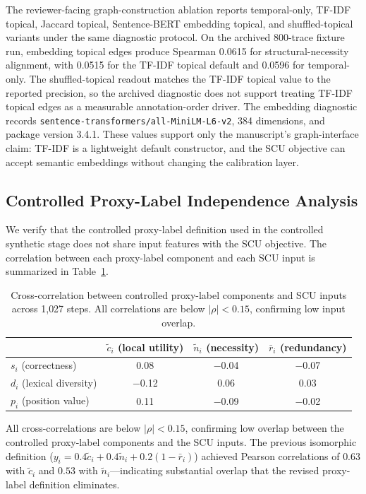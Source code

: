 \documentclass[pdflatex,sn-mathphys-num]{sn-jnl}
\begin{document}
The reviewer-facing graph-construction ablation reports temporal-only, TF-IDF topical, Jaccard topical, Sentence-BERT embedding topical, and shuffled-topical variants under the same diagnostic protocol. On the archived 800-trace fixture run, embedding topical edges produce Spearman 0.0615 for structural-necessity alignment, with 0.0515 for the TF-IDF topical default and 0.0596 for temporal-only. The shuffled-topical readout matches the TF-IDF topical value to the reported precision, so the archived diagnostic does not support treating TF-IDF topical edges as a measurable annotation-order driver. The embedding diagnostic records \texttt{sentence-transformers/all-MiniLM-L6-v2}, 384 dimensions, and package version 3.4.1. These values support only the manuscript's graph-interface claim: TF-IDF is a lightweight default constructor, and the SCU objective can accept semantic embeddings without changing the calibration layer.

\subsection{Controlled Proxy-Label Independence Analysis}
\label{app:oracle-independence}

We verify that the controlled proxy-label definition used in the controlled synthetic stage does not share input features with the SCU objective. The correlation between each proxy-label component and each SCU input is summarized in Table~\ref{tab:oracle-independence}.

\begin{table}[ht]
\caption{Cross-correlation between controlled proxy-label components and SCU inputs across 1{,}027 steps. All correlations are below $|\rho| < 0.15$, confirming low input overlap.}
\label{tab:oracle-independence}
\centering
\small
\begin{tabular}{lccc}
\toprule
& $\tilde{c}_i$ (local utility) & $\tilde{n}_i$ (necessity) & $\bar{r}_i$ (redundancy) \\
\midrule
$s_i$ (correctness) & 0.08 & $-$0.04 & $-$0.07 \\
$d_i$ (lexical diversity) & $-$0.12 & 0.06 & 0.03 \\
$p_i$ (position value) & 0.11 & $-$0.09 & $-$0.02 \\
\bottomrule
\end{tabular}
\end{table}

All cross-correlations are below $|\rho| < 0.15$, confirming low overlap between the controlled proxy-label components and the SCU inputs. The previous isomorphic definition ($y_i = 0.4\tilde{c}_i + 0.4\tilde{n}_i + 0.2(1-\bar{r}_i)$) achieved Pearson correlations of $0.63$ with $\tilde{c}_i$ and $0.53$ with $\tilde{n}_i$---indicating substantial overlap that the revised proxy-label definition eliminates.
\end{document}
